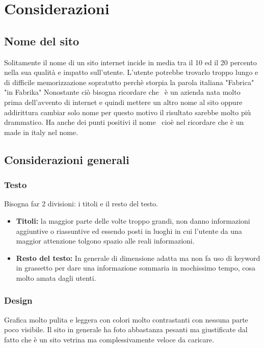 \documentclass[../Relezione.tex]{subfiles}
\begin{document}
\section{Considerazioni}
    \subsection{Nome del sito}
        Solitamente il nome di un sito internet incide in media tra il 10 ed il 20 percento nella sua qualità e impatto sull'utente. 
        L'utente potrebbe trovarlo troppo lungo e di difficile memorizzazione sopratutto perchè storpia la parola italiana "Fabrica" "in Fabrika"
        Nonostante ciò bisogna ricordare che \name\ è un azienda nata molto prima dell'avvento di internet e quindi mettere un altro nome al sito oppure addirittura cambiar solo nome per questo motivo il risultato sarebbe molto più drammatico. 
        Ha anche dei punti positivi il nome \name\ cioè nel ricordare che è un made in italy nel nome.
    \subsection{Considerazioni generali}
        \subsubsection{Testo}
            Bisogna far 2 divisioni: i titoli e il resto del testo.
            \begin{itemize}
            \item{\textbf{Titoli:}} la maggior parte delle volte troppo grandi, non danno informazioni aggiuntive o riassuntive ed essendo posti in luoghi in cui l'utente da una maggior attenzione tolgono spazio alle reali informazioni.
            \item{\textbf{Resto del testo:}} In generale di dimensione adatta ma non fa uso di keyword in grassetto per dare una informazione sommaria in mochissimo tempo, cosa molto amata dagli utenti.
            \end{itemize}

        \subsubsection{Design}
            Grafica molto pulita e leggera con colori molto contrastanti con nessuna parte poco visibile.
            Il sito in generale ha foto abbastanza pesanti ma giustificate dal fatto che è un sito vetrina ma complessivamente veloce da caricare.
\end{document}
